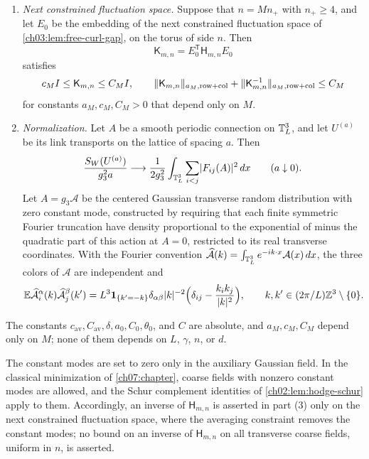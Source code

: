 \begin{theorem}
\begin{enumerate}
\item \emph{Next constrained fluctuation space.} Suppose that $n=Mn_+$ with $n_+\ge4$, and let $E_0$ be the embedding of the next constrained fluctuation space of \cref{ch03:lem:free-curl-gap}, on the torus of side $n$. Then
\[
 \mathsf K_{m,n}=E_0^{\mathsf T}\mathsf H_{m,n}E_0
\]
satisfies
\[
 c_MI\le\mathsf K_{m,n}\le C_MI,\qquad
 \lVert \mathsf K_{m,n}\rVert_{a_M,\mathrm{row}+\mathrm{col}}+\lVert \mathsf K_{m,n}^{-1}\rVert_{a_M,\mathrm{row}+\mathrm{col}}\le C_M
\]
for constants $a_M,c_M,C_M>0$ that depend only on $M$.
\item \emph{Normalization.} Let $A$ be a smooth periodic connection on $\mathbb T_L^3$, and let $U^{(a)}$ be its link transports on the lattice of spacing $a$. Then
\[
 \frac{S_W(U^{(a)})}{g_3^2a}\longrightarrow\frac1{2g_3^2}\int_{\mathbb T_L^3}\sum_{i<j}\lvert F_{ij}(A)\rvert^2\,dx\qquad(a\downarrow0).
\]
Let $A=g_3\mathcal A$ be the centered Gaussian transverse random distribution with zero constant mode, constructed by requiring that each finite symmetric Fourier truncation have density proportional to the exponential of minus the quadratic part of this action at $A=0$, restricted to its real transverse coordinates. With the Fourier convention $\widehat{\mathcal A}(k)=\int_{\mathbb T_L^3}e^{-ik\cdot x}\mathcal A(x)\,dx$, the three colors of $\mathcal A$ are independent and
\[
 \mathbb E\widehat{\mathcal A}^\alpha_i(k)\widehat{\mathcal A}^\beta_j(k')=L^3\mathbf 1_{\{k'=-k\}}\delta_{\alpha\beta}\lvert k\rvert^{-2}\Bigl(\delta_{ij}-\frac{k_ik_j}{\lvert k\rvert^2}\Bigr),\qquad k,k'\in(2\pi/L)\mathbb Z^3\setminus\{0\}.
\]
\end{enumerate}
The constants $c_{\mathrm{av}},C_{\mathrm{av}},\delta,a_0,C_0,\theta_0$, and $C$ are absolute, and $a_M,c_M,C_M$ depend only on $M$; none of them depends on $L$, $\gamma$, $n$, or $d$.
\end{theorem}

\begin{remark}\label{ch05:rem:constant-modes}
The constant modes are set to zero only in the auxiliary Gaussian field. In the classical minimization of \cref{ch07:chapter}, coarse fields with nonzero constant modes are allowed, and the Schur complement identities of \cref{ch02:lem:hodge-schur} apply to them. Accordingly, an inverse of $\mathsf H_{m,n}$ is asserted in part (3) only on the next constrained fluctuation space, where the averaging constraint removes the constant modes; no bound on an inverse of $\mathsf H_{m,n}$ on all transverse coarse fields, uniform in $n$, is asserted.
\end{remark}

